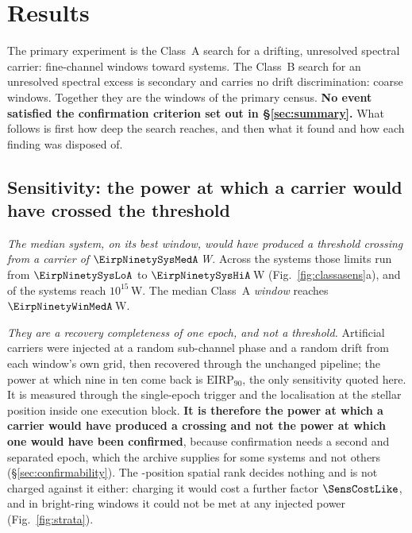 \section{Results}
\label{sec:results}

The primary experiment is the Class~A search for a drifting, unresolved
spectral carrier: \NWinA{} fine-channel windows toward \NSysClassA{}
systems. The Class~B search for an unresolved spectral excess is secondary
and carries no drift discrimination: \NWinB{} coarse windows. Together they
are the \NWindows{} windows of the primary census. \textbf{No event
satisfied the confirmation criterion set out in \S\ref{sec:summary}.} What
follows is first how deep the search reaches, and then what it found and how
each finding was disposed of.

\subsection{Sensitivity: the power at which a carrier would have crossed
the threshold} \label{sec:pninetysel}

\emph{The median system, on its best window, would have produced a threshold
crossing from a carrier of $\EirpNinetySysMedA$\,W.} Across the \NSysClassA{} systems those limits
run from $\EirpNinetySysLoA$ to $\EirpNinetySysHiA$\,W
(Fig.~\ref{fig:classasens}a), and \NSysEfifteen{} of the systems reach
$10^{15}$\,W. The median Class~A \emph{window} reaches
$\EirpNinetyWinMedA$\,W.

\emph{They are a recovery completeness of one epoch, and not a threshold.}
Artificial carriers were injected at a random sub-channel phase and a random
drift from each window's own grid, then recovered through the unchanged
pipeline; the power at which nine in ten come back is
$\mathrm{EIRP}_{90}$, the only sensitivity quoted here. It is measured
through the single-epoch trigger and the localisation at the stellar position
inside one execution block. \textbf{It is therefore the power at which a
carrier would have produced a crossing and not the power at which one would
have been confirmed}, because confirmation needs a second and separated epoch, which the archive
supplies for some systems and not others (\S\ref{sec:confirmability}). The \NCtrl-position spatial rank
decides nothing and is not charged against it either: charging it would cost
a further factor $\SensCostLike$, and in \SensNRingHiUnres{} bright-ring
windows it could not be met at any injected power (Fig.~\ref{fig:strata}).

